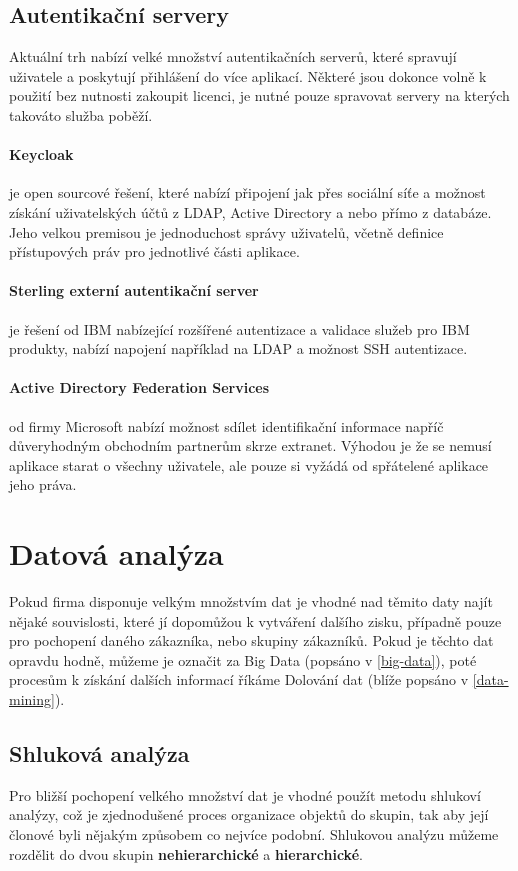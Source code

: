 \subsection{Autentikační servery}
\par Aktuální trh nabízí velké množství autentikačních serverů, které spravují uživatele a poskytují přihlášení do více aplikací. Některé jsou dokonce volně k použití bez nutnosti zakoupit licenci, je nutné pouze spravovat servery na kterých takováto služba poběží.

\paragraph{Keycloak} je open sourcové řešení, které nabízí připojení jak přes sociální síťe a možnost získání uživatelských účtů z LDAP, Active Directory a nebo přímo z databáze. Jeho velkou premisou je jednoduchost správy uživatelů, včetně definice přístupových práv pro jednotlivé části aplikace. \cite{keycloak}
\paragraph{Sterling externí autentikační server} je řešení od IBM nabízející rozšířené autentizace a validace služeb pro IBM produkty, nabízí napojení například na LDAP a možnost SSH autentizace. \cite{ibm-ster}
\paragraph{Active Directory Federation Services} od firmy Microsoft nabízí možnost sdílet identifikační informace napříč důveryhodným obchodním partnerům skrze extranet. Výhodou je že se nemusí aplikace starat o všechny uživatele, ale pouze si vyžádá od spřátelené aplikace jeho práva.  \cite{ADFS}

\section{Datová analýza}
\par Pokud firma disponuje velkým množstvím dat je vhodné nad těmito daty najít nějaké souvislosti, které jí dopomůžou k vytváření dalšího zisku, případně pouze pro pochopení daného zákazníka, nebo skupiny zákazníků. Pokud je těchto dat opravdu hodně, můžeme je označit za Big Data (popsáno v \ref{big-data}), poté procesům k získání dalších informací říkáme Dolování dat (blíže popsáno v \ref{data-mining}).

\subsection{Shluková analýza}
\par Pro bližší pochopení velkého množství dat je vhodné použít metodu shlukoví analýzy, což je zjednodušené proces organizace objektů do skupin, tak aby její člonové byli nějakým způsobem co nejvíce podobní. Shlukovou analýzu můžeme rozdělit do dvou skupin \textbf{nehierarchické} a \textbf{hierarchické}.

